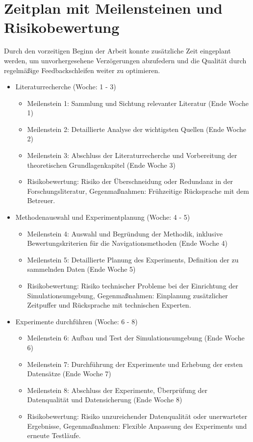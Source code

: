 \section{Zeitplan mit Meilensteinen und Risikobewertung}
Durch den vorzeitigen Beginn der Arbeit konnte zusätzliche Zeit eingeplant werden, um unvorhergesehene Verzögerungen abzufedern und die Qualität durch regelmäßige Feedbackschleifen weiter zu optimieren. \cite{ChatGPT2024}

\begin{itemize}
\item Literaturrecherche (Woche: 1 - 3) \cite{ChatGPT2024}
\begin{itemize}
\item Meilenstein 1: Sammlung und Sichtung relevanter Literatur (Ende Woche 1) \cite{ChatGPT2024}
\item Meilenstein 2: Detaillierte Analyse der wichtigsten Quellen (Ende Woche 2) \cite{ChatGPT2024}
\item Meilenstein 3: Abschluss der Literaturrecherche und Vorbereitung der theoretischen Grundlagenkapitel (Ende Woche 3) \cite{ChatGPT2024}
\item Risikobewertung: Risiko der Überschneidung oder Redundanz in der Forschungsliteratur, Gegenmaßnahmen: Frühzeitige Rücksprache mit dem Betreuer. \cite{ChatGPT2024}
\end{itemize}

\item Methodenauswahl und Experimentplanung (Woche: 4 - 5) \cite{ChatGPT2024}
\begin{itemize}
  \item Meilenstein 4: Auswahl und Begründung der Methodik, inklusive Bewertungskriterien für die Navigationsmethoden (Ende Woche 4) \cite{ChatGPT2024}
    \item Meilenstein 5: Detaillierte Planung des Experiments, Definition der zu sammelnden Daten (Ende Woche 5) \cite{ChatGPT2024}
    \item Risikobewertung: Risiko technischer Probleme bei der Einrichtung der Simulationsumgebung, Gegenmaßnahmen: Einplanung zusätzlicher Zeitpuffer und Rücksprache mit technischen Experten. \cite{ChatGPT2024}
\end{itemize}

\item Experimente durchführen (Woche: 6 - 8) \cite{ChatGPT2024}
\begin{itemize}
    \item Meilenstein 6: Aufbau und Test der Simulationsumgebung (Ende Woche 6) \cite{ChatGPT2024}
    \item Meilenstein 7: Durchführung der Experimente und Erhebung der ersten Datensätze (Ende Woche 7) \cite{ChatGPT2024}
    \item Meilenstein 8: Abschluss der Experimente, Überprüfung der Datenqualität und Datensicherung (Ende Woche 8) \cite{ChatGPT2024}
    \item Risikobewertung: Risiko unzureichender Datenqualität oder unerwarteter Ergebnisse, Gegenmaßnahmen: Flexible Anpassung des Experiments und erneute Testläufe. \cite{ChatGPT2024}
\end{itemize}


\end{itemize}
